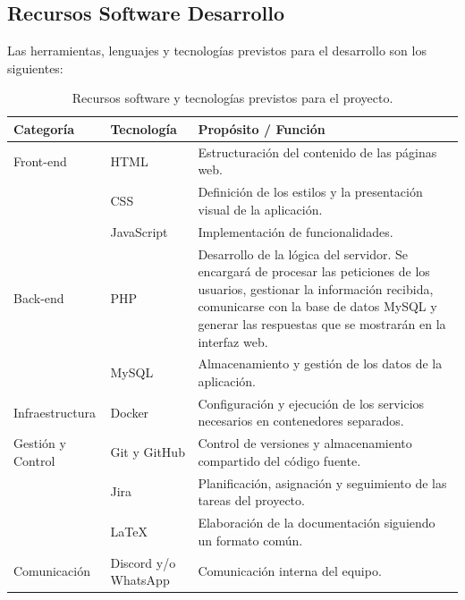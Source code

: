 \subsection{Recursos Software Desarrollo}

Las herramientas, lenguajes y tecnologías previstos para el desarrollo son los siguientes:

\begin{table}[htbp]
\centering
\small
{}
\begin{tabularx}{\textwidth}{l l X}
\toprule
\rowcolor{azulPastelApagado}
\textbf{Categoría} & \textbf{Tecnología} & \textbf{Propósito / Función} \\
\midrule
Front-end & HTML & Estructuración del contenido de las páginas web. \\
          & CSS & Definición de los estilos y la presentación visual de la aplicación. \\
          & JavaScript & Implementación de funcionalidades. \\
Back-end  & PHP & Desarrollo de la lógica del servidor. Se encargará de procesar las peticiones de los usuarios, gestionar la información recibida, comunicarse con la base de datos MySQL y generar las respuestas que se mostrarán en la interfaz web. \\
          & MySQL & Almacenamiento y gestión de los datos de la aplicación. \\
Infraestructura & Docker & Configuración y ejecución de los servicios necesarios en contenedores separados. \\
Gestión y Control & Git y GitHub & Control de versiones y almacenamiento compartido del código fuente. \\
                  & Jira & Planificación, asignación y seguimiento de las tareas del proyecto. \\
                  & \LaTeX & Elaboración de la documentación siguiendo un formato común. \\
Comunicación & Discord y/o WhatsApp & Comunicación interna del equipo. \\
\bottomrule
\end{tabularx}
\caption{Recursos software y tecnologías previstos para el proyecto.}
\label{tab:recursos_software}
\end{table}

